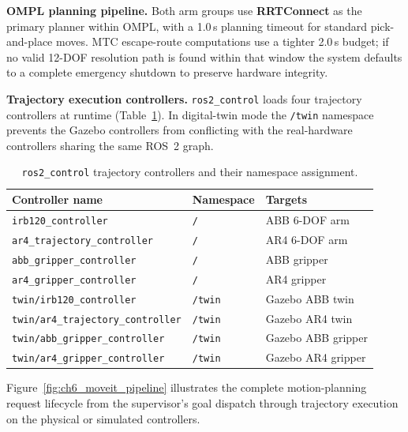\textbf{OMPL planning pipeline.} Both arm groups use \textbf{RRTConnect} as the primary planner within OMPL, with a 1.0\,s
planning timeout for standard pick-and-place moves.  MTC escape-route computations use a
tighter 2.0\,s budget; if no valid 12-DOF resolution path is found within that window the
system defaults to a complete emergency shutdown to preserve hardware integrity.

\textbf{Trajectory execution controllers.} \texttt{ros2\_control} loads four trajectory controllers at runtime (Table~\ref{tab:ch6_ctrls}).
In digital-twin mode the \texttt{/twin} namespace prevents the Gazebo controllers from
conflicting with the real-hardware controllers sharing the same ROS~2 graph.

\begin{table}[H]
\centering
\caption{\texttt{ros2\_control} trajectory controllers and their namespace assignment.}
\label{tab:ch6_ctrls}
\setlength{\tabcolsep}{5pt}
\begin{tabular}{lll}
\toprule
\textbf{Controller name}                    & \textbf{Namespace}  & \textbf{Targets} \\
\midrule
\texttt{irb120\_controller}                 & \texttt{/}          & ABB 6-DOF arm \\
\texttt{ar4\_trajectory\_controller}        & \texttt{/}          & AR4 6-DOF arm \\
\texttt{abb\_gripper\_controller}           & \texttt{/}          & ABB gripper \\
\texttt{ar4\_gripper\_controller}           & \texttt{/}          & AR4 gripper \\
\texttt{twin/irb120\_controller}            & \texttt{/twin}      & Gazebo ABB twin \\
\texttt{twin/ar4\_trajectory\_controller}   & \texttt{/twin}      & Gazebo AR4 twin \\
\texttt{twin/abb\_gripper\_controller}      & \texttt{/twin}      & Gazebo ABB gripper \\
\texttt{twin/ar4\_gripper\_controller}      & \texttt{/twin}      & Gazebo AR4 gripper \\
\bottomrule
\end{tabular}
\end{table}

Figure~\ref{fig:ch6_moveit_pipeline} illustrates the complete motion-planning request lifecycle
from the supervisor's goal dispatch through trajectory execution on the physical or simulated
controllers.

